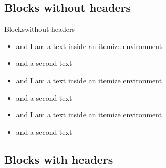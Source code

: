 \documentclass[]{beamer}
\begin{document}
\begin{frame}{\secname{}}
\end{frame}

\subsection{Blocks without headers}

\begin{frame}{Blocks}{without headers}
\begin{block}{}
\begin{itemize}
\item and I am a text inside an itemize environment
\item and a second text
\end{itemize}
\end{block}

\vfill

\begin{exampleblock}{}
\begin{itemize}
\item and I am a text inside an itemize environment
\item and a second text
\end{itemize}
\end{exampleblock}

\vfill

\begin{alertblock}{}
\begin{itemize}
\item and I am a text inside an itemize environment
\item and a second text
\end{itemize}
\end{alertblock}
\end{frame}


\subsection{Blocks with headers}
\end{document}
